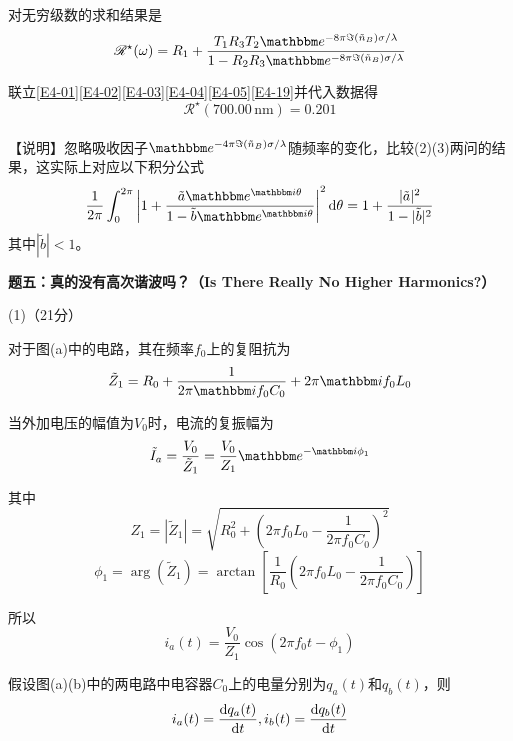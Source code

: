 \documentclass[10pt,a4paper,onecolumn,UTF8]{ctexart}
\begin{document}
	对无穷级数的求和结果是
	\begin{equation}\label{E4-19}
		\mathscr{R}^{\star}(\omega)=R_1+\frac{T_1R_3T_2\ue^{-8\pi\Im(\tilde{n}_B)\sigma/\lambda}}{1-R_2R_3\ue^{-8\pi\Im(\tilde{n}_B)\sigma/\lambda}}
	\end{equation}
	
	联立\eqref{E4-01}\eqref{E4-02}\eqref{E4-03}\eqref{E4-04}\eqref{E4-05}\eqref{E4-19}并代入数据得
	\begin{equation}
		\mathscr{R}^{\star}(700.00\,\text{nm})=0.201
	\end{equation}\\
	
	【说明】忽略吸收因子$\ue^{-4\pi\Im(\tilde{n}_B)\sigma/\lambda}$随频率的变化，比较(2)(3)两问的结果，这实际上对应以下积分公式
	\begin{equation*}
		\frac{1}{2\pi}\int_{0}^{2\pi}\left|1+\frac{\tilde{a}\ue^{\ui\theta}}{1-\tilde{b}\ue^{\ui\theta}}\right|^2\ud\theta=1+\frac{|\tilde{a}|^2}{1-|\tilde{b}|^2}
	\end{equation*}
	其中$|\tilde{b}|<1$。
	
	
	
	
	
	
	
	\setcounter{equation}{0}
	\newpage
	
	\noindent
	\textbf{题五：真的没有高次谐波吗？（Is There Really No Higher Harmonics?）}
	
	(1)（21分）
	
	对于图(a)中的电路，其在频率$f_0$上的复阻抗为
	\begin{equation}\label{E5-01}
		\tilde{Z}_1=R_0+\frac{1}{2\pi\ui f_0C_0}+2\pi\ui f_0L_0
	\end{equation}
	
	当外加电压的幅值为$V_0$时，电流的复振幅为
	\begin{equation}\label{E5-02}
		\tilde{I}_a=\frac{V_0}{\tilde{Z}_1}=\frac{V_0}{Z_1}\ue^{-\ui\phi_1}
	\end{equation}
	
	其中
	$$Z_1=|\tilde{Z}_1|=\sqrt{R_0^2+\left(2\pi f_0L_0-\frac{1}{2\pi f_0C_0}\right)^2}$$
	$$\phi_1=\arg(\tilde{Z}_1)=\arctan\left[\frac{1}{R_0}\left(2\pi f_0L_0-\frac{1}{2\pi f_0C_0}\right)\right]$$ 
	
	所以
	\begin{equation}\label{E5-03}
		i_a(t)=\frac{V_0}{Z_1}\cos(2\pi f_0t-\phi_1)
	\end{equation}
	
	假设图(a)(b)中的两电路中电容器$C_0$上的电量分别为$q_a(t)$和$q_b(t)$，则
	$$i_a(t)=\frac{\mathrm{d} q_a(t)}{\mathrm{d} t},i_b(t)=\frac{\mathrm{d} q_b(t)}{\mathrm{d} t}$$
	
\end{document}
